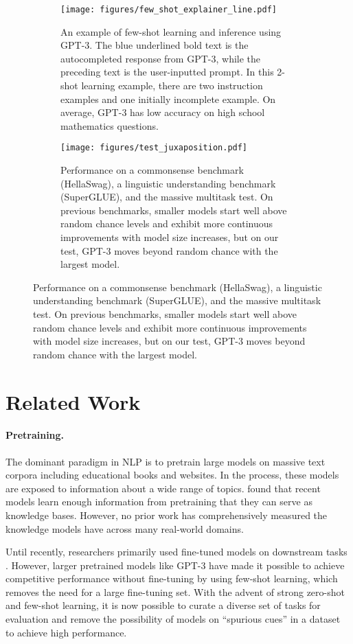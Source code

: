 \begin{figure}[t]
\vspace{-20pt}
\begin{subfigure}{.49\textwidth}
\centering
\texttt{[image: figures/few\_shot\_explainer\_line.pdf]}
\caption{An example of few-shot learning and inference using GPT-3. The \textcolor{rightblue}{blue} underlined bold text is the autocompleted response from GPT-3, while the preceding text is the user-inputted prompt. In this 2-shot learning example, there are two instruction examples and one initially incomplete example. On average, GPT-3 has low accuracy on high school mathematics questions.}\label{fig:fewshot}
\end{subfigure}\hfill%
\begin{subfigure}{.49\textwidth}
\centering
\texttt{[image: figures/test\_juxaposition.pdf]}
\caption{Performance on a commonsense benchmark (HellaSwag), a linguistic understanding benchmark (SuperGLUE), and the massive multitask test. On previous benchmarks, smaller models start well above random chance levels and exhibit more continuous improvements with model size increases, but on our test, GPT-3 moves beyond random chance with the largest model.}\label{fig:juxtaposition}
\end{subfigure}
\vspace{-13pt}
\end{figure}

\section{Related Work}
\paragraph{Pretraining.} 
The dominant paradigm in NLP is to pretrain large models on massive text corpora including educational books and websites. In the process, these models are exposed to information about a wide range of topics.
\citet{petroni2019languagemodelsasknowledgebase} found that recent models learn enough information from pretraining that they can serve as knowledge bases.
However, no prior work has comprehensively measured the knowledge models have across many real-world domains. 

Until recently, researchers primarily used fine-tuned models on downstream tasks \citep{BERTDevlin2019}. However, larger pretrained models like GPT-3 \citep{brown2020gpt3} have made it possible to achieve competitive performance without fine-tuning by using few-shot learning, which removes the need for a large fine-tuning set. With the advent of strong zero-shot and few-shot learning, it is now possible to curate a diverse set of tasks for evaluation and remove the possibility of models on ``spurious cues'' \citep{geirhos2020shortcut,Hendrycks2019NaturalAE} in a dataset to achieve high performance.

